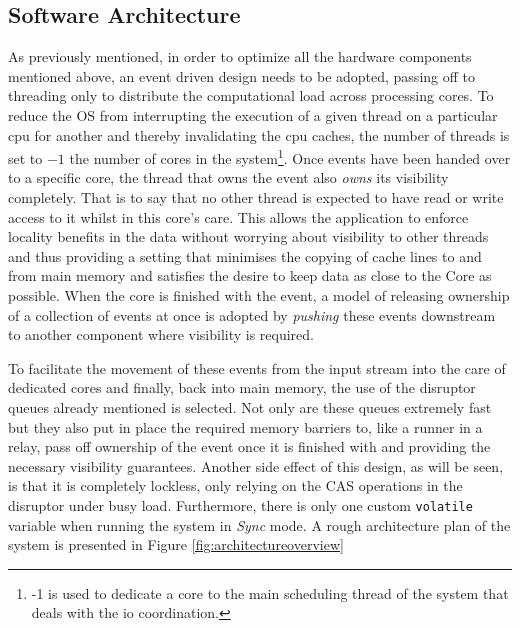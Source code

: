 \documentclass[a4paper,11pt]{scrreprt}
\begin{document}
\subsection{Software Architecture}
As previously mentioned, in order to optimize all the hardware components mentioned above, an event driven design needs to be adopted, passing off to threading only to distribute the computational load across processing cores. To reduce the OS from interrupting the execution of a given thread on a particular \acrshort{cpu} for another and thereby invalidating the \acrshort{cpu} caches, the number of threads is set to \(-1\) the number of cores in the system\footnote{-1 is used to dedicate a core to the main scheduling thread of the system that deals with the \acrshort{io} coordination.}. Once events have been handed over to a specific core, the thread that owns the event also \textit{owns} its visibility completely. That is to say that no other thread is expected to have read or write access to it whilst in this core's care. This allows the application to enforce locality benefits in the data without worrying about visibility to other threads and thus providing a setting that minimises the copying of cache lines to and from main memory and satisfies the desire to keep data as close to the Core as possible. When the core is finished with the event, a model of releasing ownership of a collection of events at once is adopted by \textit{pushing} these events downstream to another component where visibility is required. 

To facilitate the movement of these events from the input stream into the care of dedicated cores and finally, back into main memory, the use of the disruptor queues already mentioned is selected. Not only are these queues extremely fast but they also put in place the required memory barriers to, like a runner in a relay, pass off ownership of the event once it is finished with and providing the necessary visibility guarantees. Another side effect of this design, as will be seen, is that it is completely lockless, only relying on the CAS operations in the disruptor under busy load. Furthermore, there is only one custom \texttt{volatile} variable when running the system in \textit{Sync} mode. A rough architecture plan of the system is presented in Figure \ref{fig:architectureoverview}
\end{document}
